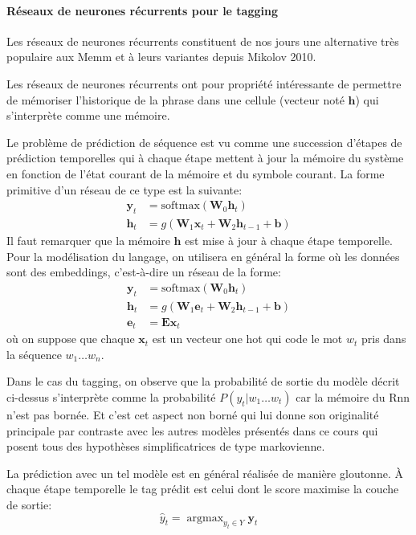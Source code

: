 \documentclass[11pt,openany]{book}
\begin{document}
\paragraph{Réseaux de neurones récurrents pour le tagging} 
Les réseaux de neurones récurrents constituent de nos jours une alternative très
populaire aux {\sc  Memm} et à leurs variantes depuis Mikolov 2010. 

Les réseaux de neurones récurrents ont pour propriété intéressante de
permettre de mémoriser l'historique de la phrase dans une cellule
(vecteur noté $\mathbf{h}$) qui s'interprète comme une mémoire. 

Le problème de prédiction de séquence est vu comme une succession
d'étapes de prédiction temporelles qui à chaque étape mettent à jour
la mémoire du système en fonction de l'état courant de la mémoire et
du symbole courant. 
La forme primitive d'un réseau de ce type est la suivante:
\begin{align}
\mathbf{y}_t &= \text{softmax}(\mathbf{W}_0 \mathbf{h}_t)\\
\mathbf{h}_t &= g(\mathbf{W}_1\mathbf{x}_t + \mathbf{W}_2
\mathbf{h}_{t-1}+\mathbf{b} )
\end{align}
Il faut remarquer que la mémoire $\mathbf{h}$ est mise à jour à chaque
étape temporelle. Pour la modélisation du langage, on utilisera en
général la forme où les données sont des embeddings, c'est-à-dire un
réseau de la forme:
\begin{align}
\mathbf{y}_t &= \text{softmax}(\mathbf{W}_0 \mathbf{h}_t)\\
\mathbf{h}_t &= g(\mathbf{W}_1\mathbf{e}_t + \mathbf{W}_2
\mathbf{h}_{t-1}+\mathbf{b} )\\
\mathbf{e}_t &= \mathbf{E}\mathbf{x}_t
\end{align}
où on suppose que chaque $\mathbf{x}_t$ est un vecteur one hot qui
code le mot $w_t$ pris dans la séquence $w_1\ldots w_n$.

Dans le cas du tagging, on observe que la probabilité de sortie du
modèle décrit ci-dessus s'interprète comme la probabilité 
$P(y_t | w_1\ldots w_t)$ car la mémoire du {\sc Rnn}
n'est pas bornée.  Et c'est cet aspect non borné qui lui donne son
originalité principale par contraste avec les autres modèles présentés
dans ce cours qui posent tous des hypothèses simplificatrices de type
markovienne.  

La prédiction avec un tel modèle est en général réalisée de manière
gloutonne. \`A chaque étape temporelle le tag prédit est celui dont le
score maximise la couche de sortie:
\begin{displaymath}
\hat{y}_t  = \mathop{\text{argmax}}_{y_t \in Y} \mathbf{y}_t
\end{displaymath}
\end{document}
